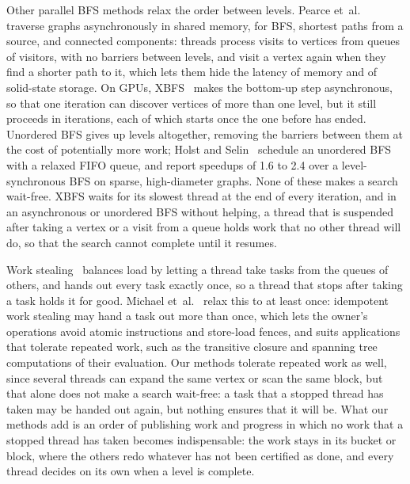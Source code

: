 Other parallel BFS methods relax the order between levels. Pearce et~al.~\cite{pearce_async} traverse graphs asynchronously in shared memory, for BFS, shortest paths from a source, and connected components: threads process visits to vertices from queues of visitors, with no barriers between levels, and visit a vertex again when they find a shorter path to it, which lets them hide the latency of memory and of solid-state storage. On GPUs, XBFS~\cite{xbfs} makes the bottom-up step asynchronous, so that one iteration can discover vertices of more than one level, but it still proceeds in iterations, each of which starts once the one before has ended. Unordered BFS gives up levels altogether, removing the barriers between them at the cost of potentially more work; Holst and Selin~\cite{holst_unordered} schedule an unordered BFS with a relaxed FIFO queue, and report speedups of 1.6 to 2.4 over a level-synchronous BFS on sparse, high-diameter graphs. None of these makes a search wait-free. XBFS waits for its slowest thread at the end of every iteration, and in an asynchronous or unordered BFS without helping, a thread that is suspended after taking a vertex or a visit from a queue holds work that no other thread will do, so that the search cannot complete until it resumes.

Work stealing~\cite{blumofe_workstealing} balances load by letting a thread take tasks from the queues of others, and hands out every task exactly once, so a thread that stops after taking a task holds it for good. Michael et~al.~\cite{michael_iws} relax this to at least once: idempotent work stealing may hand a task out more than once, which lets the owner's operations avoid atomic instructions and store-load fences, and suits applications that tolerate repeated work, such as the transitive closure and spanning tree computations of their evaluation. Our methods tolerate repeated work as well, since several threads can expand the same vertex or scan the same block, but that alone does not make a search wait-free: a task that a stopped thread has taken may be handed out again, but nothing ensures that it will be. What our methods add is an order of publishing work and progress in which no work that a stopped thread has taken becomes indispensable: the work stays in its bucket or block, where the others redo whatever has not been certified as done, and every thread decides on its own when a level is complete.

